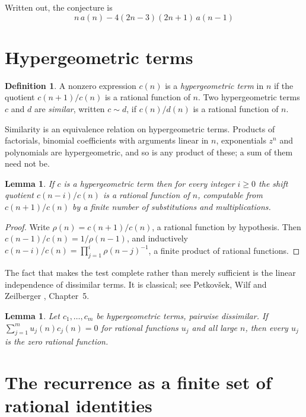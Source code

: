 \documentclass[11pt,a4paper]{article}
\theoremstyle{plain}
\newtheorem{lemma}[theorem]{Lemma}
\theoremstyle{definition}
\newtheorem{definition}[theorem]{Definition}
\begin{document}
Written out, the conjecture is
\begin{equation}\label{eq:conj}
n\,a(n) -  4 \left(2 n - 3\right) \left(2 n + 1\right)\,a(n-1)
\end{equation}

\section{Hypergeometric terms}

\begin{definition}
A nonzero expression $c(n)$ is a \emph{hypergeometric term} in $n$ if the quotient
$c(n+1)/c(n)$ is a rational function of $n$. Two hypergeometric terms $c$ and $d$ are
\emph{similar}, written $c\sim d$, if $c(n)/d(n)$ is a rational function of $n$.
\end{definition}

Similarity is an equivalence relation on hypergeometric terms. Products of factorials,
binomial coefficients with arguments linear in $n$, exponentials $z^{n}$ and polynomials
are hypergeometric, and so is any product of these; a sum of them need not be.

\begin{lemma}\label{lem:shift}
If $c$ is a hypergeometric term then for every integer $i\ge 0$ the shift quotient
$c(n-i)/c(n)$ is a rational function of $n$, computable from $c(n+1)/c(n)$ by a finite
number of substitutions and multiplications.
\end{lemma}

\begin{proof}
Write $\rho(n)=c(n+1)/c(n)$, a rational function by hypothesis. Then
$c(n-1)/c(n)=1/\rho(n-1)$, and inductively
$c(n-i)/c(n)=\prod_{j=1}^{i}\rho(n-j)^{-1}$, a finite product of rational functions.
\end{proof}

The fact that makes the test complete rather than merely sufficient is the linear
independence of dissimilar terms. It is classical; see Petkov\v{s}ek, Wilf and Zeilberger
\cite{AB}, Chapter~5.

\begin{lemma}\label{lem:indep}
Let $c_{1},\dots,c_{m}$ be hypergeometric terms, pairwise dissimilar. If
$\sum_{j=1}^{m}u_{j}(n)c_{j}(n)=0$ for rational functions $u_{j}$ and all large $n$, then
every $u_{j}$ is the zero rational function.
\end{lemma}

\section{The recurrence as a finite set of rational identities}
\end{document}
